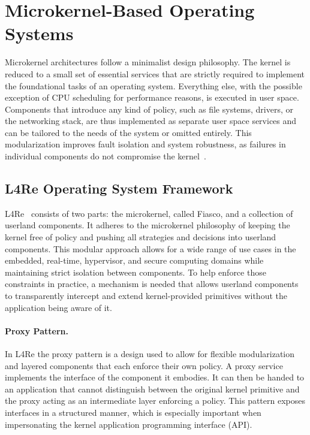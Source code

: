 \section{Microkernel-Based Operating Systems}

Microkernel architectures follow a minimalist design philosophy.
The kernel is reduced to a small set of essential services that are strictly required to implement the foundational tasks of an operating system.
Everything else, with the possible exception of CPU scheduling for performance reasons, is executed in user space.
Components that introduce any kind of policy, such as file systems, drivers, or the networking stack, are thus implemented as separate user space services and can be tailored to the needs of the system or omitted entirely.
This modularization improves fault isolation and system robustness, as failures in individual components do not compromise the kernel~\cite{core-dumps, IntroMOSlecture}.

\subsection{L4Re Operating System Framework}

L4Re~\cite{l4re} consists of two parts: the microkernel, called Fiasco, and a collection of userland components.
It adheres to the microkernel philosophy of keeping the kernel free of policy and pushing all strategies and decisions into userland components.
This modular approach allows for a wide range of use cases in the embedded, real-time, hypervisor, and secure computing domains while maintaining strict isolation between components.
To help enforce those constraints in practice, a mechanism is needed that allows userland components to transparently intercept and extend kernel-provided primitives without the application being aware of it.

\paragraph{Proxy Pattern.}
\label{sec:proxy}

In L4Re the proxy pattern is a design used to allow for flexible modularization and layered components that each enforce their own policy.
A proxy service implements the interface of the component it embodies.
It can then be handed to an application that cannot distinguish between the original kernel primitive and the proxy acting as an intermediate layer enforcing a policy.
This pattern exposes interfaces in a structured manner, which is especially important when impersonating the kernel application programming interface (API).

